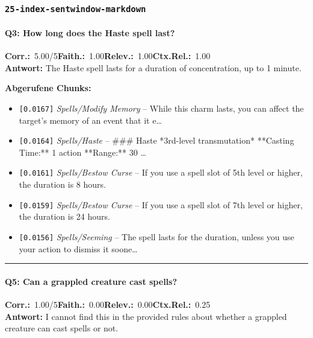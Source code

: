 \subsubsection*{\texttt{25-index-sentwindow-markdown}}
\label{app:samples:25_index_sentwindow_markdown}

\paragraph{Q3: How long does the Haste spell last?}
\noindent \textbf{Corr.:}~5.00/5\quad \textbf{Faith.:}~1.00\quad \textbf{Relev.:}~1.00\quad \textbf{Ctx.Rel.:}~1.00\\

\noindent\textbf{Antwort:} The Haste spell lasts for a duration of concentration, up to 1 minute.

\noindent\textbf{Abgerufene Chunks:}
\begin{itemize}[noitemsep, topsep=2pt]
  \item[\textbf{\#1}] \texttt{[0.0167]} \textit{Spells/Modify Memory} -- While this charm lasts, you can affect the target's memory of an event that it e\ldots
  \item[\textbf{\#2}] \texttt{[0.0164]} \textit{Spells/Haste} -- \#\#\# Haste  *3rd-level transmutation*  **Casting Time:** 1 action  **Range:** 30 \ldots
  \item[\textbf{\#3}] \texttt{[0.0161]} \textit{Spells/Bestow Curse} -- If you use a spell slot of 5th level or higher, the duration is 8 hours.
  \item[\textbf{\#4}] \texttt{[0.0159]} \textit{Spells/Bestow Curse} -- If you use a spell slot of 7th level or higher, the duration is 24 hours.
  \item[\textbf{\#5}] \texttt{[0.0156]} \textit{Spells/Seeming} -- The spell lasts for the duration, unless you use your action to dismiss it soone\ldots
\end{itemize}
\vspace{4pt}
\hrule
\vspace{6pt}

\paragraph{Q5: Can a grappled creature cast spells?}
\noindent \textbf{Corr.:}~1.00/5\quad \textbf{Faith.:}~0.00\quad \textbf{Relev.:}~0.00\quad \textbf{Ctx.Rel.:}~0.25\\

\noindent\textbf{Antwort:} I cannot find this in the provided rules about whether a grappled creature can cast spells or not.

